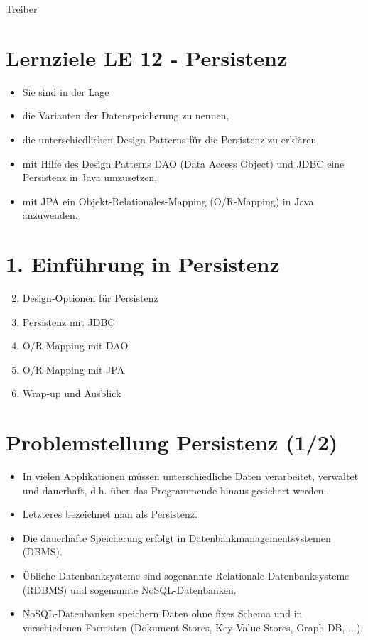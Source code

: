 Treiber

\section*{Lernziele LE 12 - Persistenz}
\begin{itemize}
  \item Sie sind in der Lage
  \item die Varianten der Datenspeicherung zu nennen,
  \item die unterschiedlichen Design Patterns für die Persistenz zu erklären,
  \item mit Hilfe des Design Patterns DAO (Data Access Object) und JDBC eine Persistenz in Java umzusetzen,
  \item mit JPA ein Objekt-Relationales-Mapping (O/R-Mapping) in Java anzuwenden.
\end{itemize}

\section*{1. Einführung in Persistenz}
\begin{enumerate}
  \setcounter{enumi}{1}
  \item Design-Optionen für Persistenz
  \item Persistenz mit JDBC
  \item O/R-Mapping mit DAO
  \item O/R-Mapping mit JPA
  \item Wrap-up und Ausblick
\end{enumerate}

\section*{Problemstellung Persistenz (1/2)}
\begin{itemize}
  \item In vielen Applikationen müssen unterschiedliche Daten verarbeitet, verwaltet und dauerhaft, d.h. über das Programmende hinaus gesichert werden.
  \item Letzteres bezeichnet man als Persistenz.
  \item Die dauerhafte Speicherung erfolgt in Datenbankmanagementsystemen (DBMS).
  \item Übliche Datenbanksysteme sind sogenannte Relationale Datenbanksysteme (RDBMS) und sogenannte NoSQL-Datenbanken.
  \item NoSQL-Datenbanken speichern Daten ohne fixes Schema und in verschiedenen Formaten (Dokument Stores, Key-Value Stores, Graph DB, ...).
\end{itemize}

